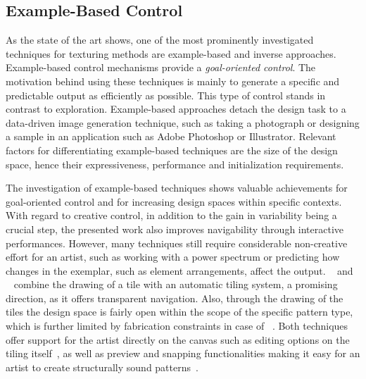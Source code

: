 \subsection{Example-Based Control}
\label{subsubsec:analysis_creative_means_example}

As the state of the art shows, one of the most prominently investigated techniques for texturing methods are example-based and inverse approaches. Example-based control mechanisms provide a \textit{goal-oriented control}. The motivation behind using these techniques is mainly to generate a specific and predictable output as efficiently as possible. This type of control stands in contrast to exploration. Example-based approaches detach the design task to a data-driven image generation technique, such as taking a photograph or designing a sample in an application such as Adobe Photoshop or Illustrator. Relevant factors for differentiating example-based techniques are the size of the design space, hence their expressiveness, performance and initialization requirements. 

The investigation of example-based techniques shows valuable achievements for goal-oriented control and for increasing design spaces within specific contexts. With regard to creative control, in addition to the gain in variability being a crucial step, the presented work also improves navigability through interactive performances. However, many techniques still require considerable non-creative effort for an artist, such as working with a power spectrum or predicting how changes in the exemplar, such as element arrangements, affect the output. \citeauthor*{tu_2020_cct}~\cite{tu_2020_cct} and \citeauthor*{bian_2018_tpd}~\cite{bian_2018_tpd} combine the drawing of a tile with an automatic tiling system, a promising direction, as it offers transparent navigation. Also, through the drawing of the tiles the design space is fairly open within the scope of the specific pattern type, which is further limited by fabrication constraints in case of \citeauthor*{bian_2018_tpd}~\cite{bian_2018_tpd}. Both techniques offer support for the artist directly on the canvas such as editing options on the tiling itself~\cite{tu_2020_cct}, as well as preview and snapping functionalities making it easy for an artist to create structurally sound patterns~\cite{bian_2018_tpd}. 

